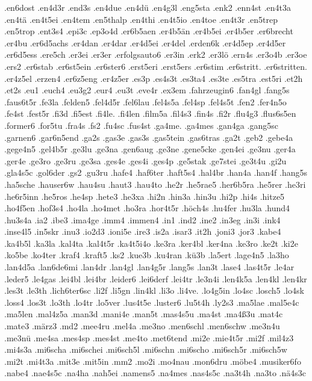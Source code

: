 {.en6dost
.en4d3r
.end3s
.en4due
.en4dü
.en4g3l
.eng5sta
.enk2
.enn4st
.en4t3a
.en4tä
.en4t5ei
.en4tem
.en5thalp
.en4thi
.en4t5io
.en4toe
.en4t3r
.en5trep
.en5trop
.ent3s4
.epi3c
.ep3o4d
.er6b5aen
.er4b5än
.er4b5ei
.er4b5er
.er6brecht
.er4bu
.er6d5achs
.er4dan
.er4dar
.er4d5ei
.er4del
.erden6k
.er4d5ep
.er4d5er
.er6d5ess
.ere5ch
.er3ei
.er3er
.erfolgsauto6
.er3in
.erk2
.er3lö
.ern4s
.er3o4b
.er3oe
.ers2
.er6stab
.er6st5ein
.er6ster6
.erst5eri
.erst5ers
.er6stim
.er6stritt.
.er6stritten.
.er4z5el
.erzen4
.er6z5eng
.er4z5er
.es3p
.es4s3t
.es3ta4
.es3te
.es5tra
.est5ri
.et2h
.et2s
.eu1
.euch4
.eu3g2
.eur4
.eu3t
.eve4r
.ex3em
.fahrzeugin6
.fan4gl
.fang5s
.faus6t5r
.fe3la
.felden5
.fel4d5r
.fel6lau
.fel4s5a
.fel4sp
.fel4s5t
.fen2
.fer4n5o
.fe4st
.fest5r
.fi3d
.fi5est
.fi4le.
.fi4len
.film5a
.fil4s3
.fin4s
.fi2r
.flu4g3
.flus6s5en
.former6
.for5tu
.fra4s
.fs2
.fu4sc
.fus4st
.ga4me.
.ga4mes
.gan4ga
.gang5sc
.garnen6
.gar6n5end
.ga2s
.gas3e
.gas3s
.gas5tein
.gas6tras
.ga2t
.geb2
.gebe4a
.gege4n5
.gel4b5r
.ge3lu
.ge3na
.gen6aug
.ge3ne
.gene5cke
.gen4ei
.ge3nu
.ger4a
.ger4e
.ge3ro
.ge3ru
.ge3sa
.ges4e
.ges4i
.ges4p
.ge5stak
.ge7stei
.ge3t4u
.gi2u
.gla4s5c
.gol6der
.gs2
.gu3ru
.hafe4
.haf6ter
.haft5s4
.hal4br
.han4a
.han4f
.hang5s
.ha5sche
.hauser6w
.hau4su
.haut3
.hau4to
.he2r
.he5rae5
.her6b5ra
.he5rer
.he3ri
.he6r5inn
.he5ros
.he4sp
.hete3
.he3xa
.hi2n
.hin3a
.hin3u
.hi2p
.hi4s
.hitze5
.ho4f5en
.hof3s4
.ho4la
.ho4met
.ho3ra
.hor4t5r
.höch4s
.hu4fer
.hu3la
.hund4
.hu3s4a
.ia2
.ibe3
.ima4ge
.imm4
.immen4
.in1
.ind2
.ine2
.in3eg
.in3i
.ink4
.inse4l5
.in5skr
.inu3
.io2d3
.ioni5e
.ire3
.is2a
.isar3
.it2h
.joni3
.jor3
.kabe4
.ka4b5l
.ka3la
.kal4ta
.kal4t5r
.ka4t5i4o
.ke3ra
.ker4bl
.ker4na
.ke3ro
.ke2t
.ki2e
.ko5be
.ko4ter
.kraf4
.kraft5
.ks2
.kue3b
.ku4ran
.kü3b
.la5ert
.lage4n5
.la3ho
.lan4d5a
.lan6de6mi
.lan4dr
.lan4gl
.lan4g5r
.lang5s
.lan3t
.lase4
.las4t5r
.le4ar
.leder5
.le4gas
.lei4bl
.lei4br
.leider6
.lei6derf
.lei4tr
.le3n4i
.len4k5a
.len4kl
.len4kr
.les3t
.le3th
.lich6ter6sc
.li2f
.li5gn
.lin4kl
.li3o
.li4ve.
.lo4g5in
.lo4sc
.losch5
.lo4sk
.loss4
.los3t
.lo3th
.lo4tr
.lo5ver
.lus4t5e
.luster6
.lu5t4h
.ly2s3
.ma5lae
.mal5e4c
.ma5len
.mal4z5a
.man3d
.mani4e
.man5t
.mas4s5u
.ma4st
.ma4ß3u
.mat4c
.mate3
.märz3
.md2
.mee4ru
.mel4a
.me3no
.men6schl
.men6schw
.me3n4u
.me3nü
.me4sa
.mes4sp
.mes4st
.me4to
.met6tend
.mi2e
.mie4t5r
.mi2f
.mil4z3
.mi4s3a
.mi6scha
.mi6schei
.mi6sch5l
.mi6schn
.mi6scho
.mi6sch5r
.mi6sch5w
.mi2t
.mi4t3a
.mit3e
.mit5in
.mm2
.mo2i
.mo4nau
.mon6dru
.möbe4
.musiker6fo
.nabe4
.nae4s5c
.na4ha
.nah5ei
.namens5
.na4mes
.nas4s5c
.na3t4h
.na3to
.nä4s3c
}
